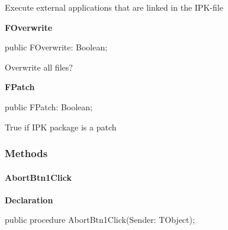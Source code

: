 \documentclass{report}
\newif\ifpdf
\begin{document}
\begin{list}{}
\begin{flushleft}
\ifpdf
\end{flushleft}
\fi


\par Execute external applications that are linked in the IPK{-}file\label{mainunit.TIWizFrm-FOverwrite}
\item[\textbf{FOverwrite}\hfill]
\ifpdf
\begin{flushleft}
\fi
\begin{ttfamily}
public FOverwrite: Boolean;\end{ttfamily}

\ifpdf
\end{flushleft}
\fi


\par Overwrite all files?\label{mainunit.TIWizFrm-FPatch}
\item[\textbf{FPatch}\hfill]
\ifpdf
\begin{flushleft}
\fi
\begin{ttfamily}
public FPatch: Boolean;\end{ttfamily}

\ifpdf
\end{flushleft}
\fi


\par True if IPK package is a patch\end{list}
\subsubsection*{\large{\textbf{Methods}}\normalsize\hspace{1ex}\hfill}
\paragraph*{AbortBtn1Click}\hspace*{\fill}

\label{mainunit.TIWizFrm-AbortBtn1Click}
\begin{list}{}{
\setlength{\itemindent}{0cm}
\setlength{\listparindent}{0cm}
\setlength{\leftmargin}{\evensidemargin}
\addtolength{\leftmargin}{\tmplength}
\settowidth{\labelsep}{X}
\addtolength{\leftmargin}{\labelsep}
\setlength{\labelwidth}{\tmplength}
}
\item[\textbf{Declaration}\hfill]
\ifpdf
\begin{flushleft}
\fi
\begin{ttfamily}
public procedure AbortBtn1Click(Sender: TObject);\end{ttfamily}

\ifpdf
\end{flushleft}
\fi

\end{list}
\end{document}

